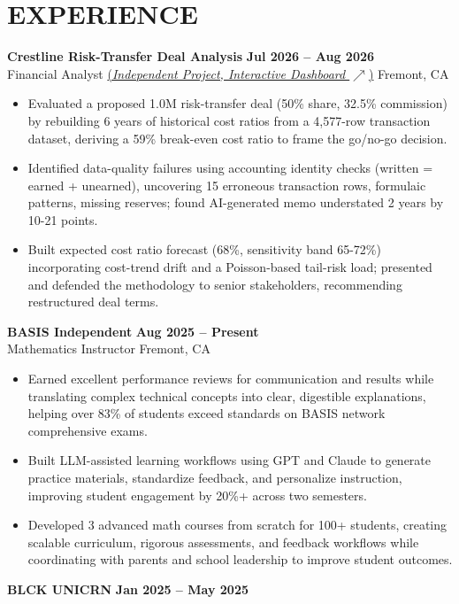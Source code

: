 \documentclass[a4paper,10pt]{article}
\renewcommand{\$}{{\fontencoding{OT1}\selectfont\char36}}
\begin{document}
\section*{EXPERIENCE}
\textbf{Crestline Risk-Transfer Deal Analysis} \hfill \textbf{Jul 2026 -- Aug 2026}\\
Financial Analyst \href{https://ajay8005.github.io/personal-website/finance.html}{(\textit{Independent Project, Interactive Dashboard $\nearrow$})} \hfill Fremont, CA
\begin{itemize}
\item Evaluated a proposed \$1.0M risk-transfer deal (50\% share, 32.5\% commission) by rebuilding 6 years of historical cost ratios from a 4,577-row transaction dataset, deriving a 59\% break-even cost ratio to frame the go/no-go decision.
\item Identified data-quality failures using accounting identity checks (written = earned + unearned), uncovering 15 erroneous transaction rows, formulaic patterns, missing reserves; found AI-generated memo understated 2 years by 10-21 points.
\item Built expected cost ratio forecast (68\%, sensitivity band 65-72\%) incorporating cost-trend drift and a Poisson-based tail-risk load; presented and defended the methodology to senior stakeholders, recommending restructured deal terms.
\end{itemize}
\vspace{3pt}
\textbf{BASIS Independent} \hfill \textbf{Aug 2025 -- Present}\\
Mathematics Instructor \hfill Fremont, CA
\begin{itemize}
\item Earned excellent performance reviews for communication and results while translating complex technical concepts into clear, digestible explanations, helping over 83\% of students exceed standards on BASIS network comprehensive exams.
\item Built LLM-assisted learning workflows using GPT and Claude to generate practice materials, standardize feedback, and personalize instruction, improving student engagement by 20\%+ across two semesters.
\item Developed 3 advanced math courses from scratch for 100+ students, creating scalable curriculum, rigorous assessments, and feedback workflows while coordinating with parents and school leadership to improve student outcomes.
\end{itemize}
\vspace{3pt}
\textbf{BLCK UNICRN} \hfill \textbf{Jan 2025 -- May 2025}\\
\end{document}
